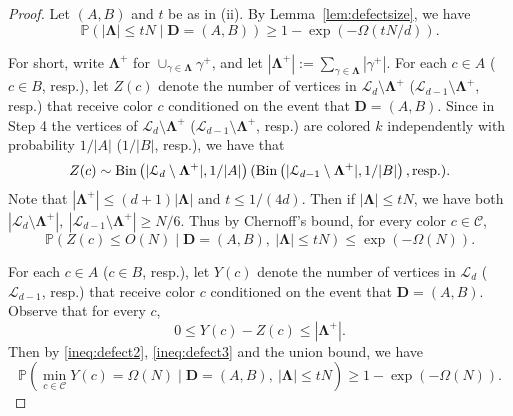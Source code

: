 \documentclass{amsart}
\theoremstyle{definition}
\newcommand{\bO}{O}
\newcommand{\cC}{\mathcal{C} }
\newcommand{\cL}{\mathcal{L} }
\newcommand{\0}[0]{\emptyset}
\newcommand{\bin}[0]{\mbox{\rm{Bin}}}
\newcommand{\pr}[0]{\mathbb{P}}
\begin{document}
\begin{proof}
Let $(A, B)$ and $t$ be as in (ii). By Lemma~\ref{lem:defectsize}, we have
\begin{equation}\label{ineq:defect1}
\pr\left(|\mathbf\Lambda|\leq tN \mid \mathbf D=(A, B)\right) \geq 1 - \exp\left(-\Omega\left(tN/d\right)\right).
\end{equation}


For short, write $\mathbf{\Lambda}^+$ for $\cup_{\gamma\in\mathbf{\Lambda}}\gamma^+$, and let $|\mathbf{\Lambda}^+|:= \sum_{\gamma\in\mathbf{\Lambda}}|\gamma^+|$.
For each $c\in A$ ($c\in B$, resp.), let $Z(c)$ denote the number of vertices in $\cL_d\setminus\mathbf{\Lambda}^+$ ($\cL_{d-1}\setminus\mathbf{\Lambda}^+$, resp.) that receive color $c$ conditioned on the event that $\mathbf D=(A, B)$. Since in Step 4 the vertices of $\cL_d\setminus\mathbf{\Lambda}^+$ ($\cL_{d-1}\setminus\mathbf{\Lambda}^+$, resp.) are colored $k$ independently with probability $1/|A|$ ($1/|B|$, resp.), we have that
\[
Z(c)\sim \bin\left(|\cL_d\setminus\mathbf{\Lambda}^+|, 1/|A|\right) (\bin\left(|\cL_{d-1}\setminus\mathbf{\Lambda}^+|, 1/|B|\right), \mbox{resp.}).
\]
Note that $|\mathbf{\Lambda}^+|\leq (d+1)|\mathbf{\Lambda}|$ and $t\leq 1/(4d)$. 
Then if $|\mathbf \Lambda|\leq tN$, we have both $|\cL_d\setminus\mathbf{\Lambda}^+|,\ |\cL_{d-1}\setminus\mathbf{\Lambda}^+| \geq N/6$.
Thus by Chernoff's bound, for every color $c\in\cC$, 
\begin{equation}\label{ineq:defect2}
\pr\left(Z(c)\leq \bO(N) \mid \mathbf D=(A, B),\ |\mathbf \Lambda|\leq tN\right) \leq \exp\left(-\Omega\left(N\right)\right).
\end{equation}

For each $c\in A$ ($c\in B$, resp.), let $Y(c)$ denote the number of vertices in $\cL_d$ ($\cL_{d-1}$, resp.) that receive color $c$ conditioned on the event that $\mathbf D=(A, B)$.
Observe that for every $c$,
\begin{equation}\label{ineq:defect3}
0\leq Y(c) - Z(c) \leq |\mathbf{\Lambda}^+|.
\end{equation}
Then by \eqref{ineq:defect2}, \eqref{ineq:defect3} and the union bound, we have
\begin{equation}\label{ineq:defect4}
\pr\left(\min_{c\in\cC}Y(c)=\Omega(N) \mid \mathbf D=(A, B),\ |\mathbf \Lambda|\leq tN\right) \geq 1 - \exp\left(-\Omega\left(N\right)\right).
\end{equation}


\end{proof}
\end{document}
